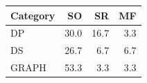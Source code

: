 \begin{tabular}{@{}lrrr@{}}
\toprule
Category & SO & SR & MF \\
\midrule
DP & 30.0 & 16.7 & 3.3 \\
DS & 26.7 & 6.7 & 6.7 \\
GRAPH & 53.3 & 3.3 & 3.3 \\
\bottomrule
\end{tabular}
